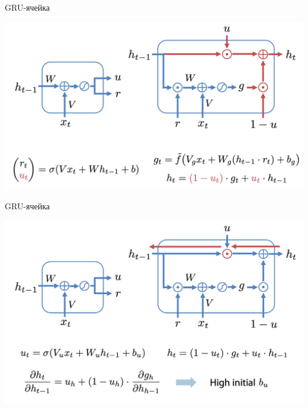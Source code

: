 \documentclass[notes,12pt, aspectratio=169]{beamer}
\begin{document}
\begin{frame}{GRU-ячейка}
\begin{center}
	\includegraphics[width=.8\linewidth]{gru3.png}
\end{center}
\end{frame}

\begin{frame}{GRU-ячейка}
\begin{center}
	\includegraphics[width=.8\linewidth]{gru4.png}
\end{center}
\end{frame}
\end{document}
